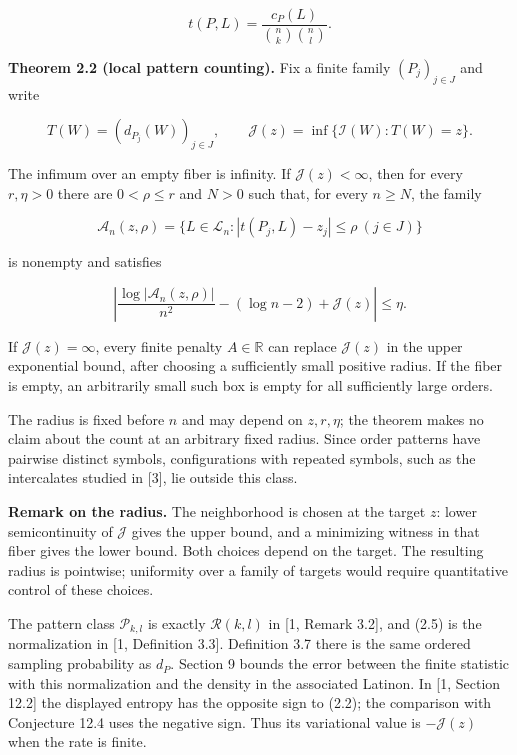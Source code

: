 \documentclass[english,11pt,a4paper]{article}
\newcounter{none}
\begin{document}
\nopagebreak[4]
\[t(P,L)=\frac{c_P(L)}{\binom nk\binom nl}.\tag{2.5}\]

\textbf{Theorem 2.2 (local pattern counting).} Fix a finite family \((P_j)_{j\in J}\) and write

\nopagebreak[4]
\[T(W)=(d_{P_j}(W))_{j\in J},\qquad
\mathcal J(z)=\inf\{\mathcal I(W):T(W)=z\}.\tag{2.6}\]

The infimum over an empty fiber is infinity. If \(\mathcal J(z)<\infty\), then for every \(r,\eta>0\) there are \(0<\rho\le r\) and \(N>0\) such that, for every \(n\ge N\), the family

\nopagebreak[4]
\[\mathcal A_n(z,\rho)=\{L\in\mathcal L_n:|t(P_j,L)-z_j|\le\rho\ (j\in J)\}\tag{2.7}\]

is nonempty and satisfies

\nopagebreak[4]
\[\left|\frac{\log|\mathcal A_n(z,\rho)|}{n^2}-(\log n-2)+\mathcal J(z)\right|\le\eta.\tag{2.8}\]

If \(\mathcal J(z)=\infty\), every finite penalty \(A\in\mathbb R\) can replace \(\mathcal J(z)\) in the upper exponential bound, after choosing a sufficiently small positive radius. If the fiber is empty, an arbitrarily small such box is empty for all sufficiently large orders.

The radius is fixed before \(n\) and may depend on \(z,r,\eta\); the theorem makes no claim about the count at an arbitrary fixed radius. Since order patterns have pairwise distinct symbols, configurations with repeated symbols, such as the intercalates studied in {[}3{]}, lie outside this class.

\textbf{Remark on the radius.} The neighborhood is chosen at the target \(z\): lower semicontinuity of \(\mathcal J\) gives the upper bound, and a minimizing witness in that fiber gives the lower bound. Both choices depend on the target. The resulting radius is pointwise; uniformity over a family of targets would require quantitative control of these choices.

The pattern class \(\mathcal P_{k,l}\) is exactly \(\mathcal R(k,l)\) in {[}1, Remark 3.2{]}, and (2.5) is the normalization in {[}1, Definition 3.3{]}. Definition 3.7 there is the same ordered sampling probability as \(d_P\). Section 9 bounds the error between the finite statistic with this normalization and the density in the associated Latinon. In {[}1, Section 12.2{]} the displayed entropy has the opposite sign to (2.2); the comparison with Conjecture 12.4 uses the negative sign. Thus its variational value is \(-\mathcal J(z)\) when the rate is finite.
\end{document}
